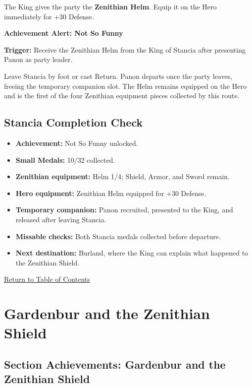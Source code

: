 \documentclass[
  american,
  10pt,
  letterpaper,
  oneside,
  open=any]{scrreprt}
\providecommand{\tightlist}{%
  \setlength{\itemsep}{0pt}\setlength{\parskip}{0pt}}
\begin{document}
The King gives the party the \textbf{Zenithian Helm}. Equip it on the
Hero immediately for +30 Defense.

\begin{achievementalert}

\textbf{Achievement Alert: Not So Funny}

\textbf{Trigger:} Receive the Zenithian Helm from the King of Stancia
after presenting Panon as party leader.

\end{achievementalert}

Leave Stancia by foot or cast Return. Panon departs once the party
leaves, freeing the temporary companion slot. The Helm remains equipped
on the Hero and is the first of the four Zenithian equipment pieces
collected by this route.

\section{Stancia Completion Check}\label{stancia-completion-check}

\begin{itemize}
\tightlist
\item
  \textbf{Achievement:} Not So Funny unlocked.
\item
  \textbf{Small Medals:} 10/32 collected.
\item
  \textbf{Zenithian equipment:} Helm 1/4; Shield, Armor, and Sword
  remain.
\item
  \textbf{Hero equipment:} Zenithian Helm equipped for +30 Defense.
\item
  \textbf{Temporary companion:} Panon recruited, presented to the King,
  and released after leaving Stancia.
\item
  \textbf{Missable checks:} Both Stancia medals collected before
  departure.
\item
  \textbf{Next destination:} Burland, where the King can explain what
  happened to the Zenithian Shield.
\end{itemize}

\hyperref[table-of-contents]{Return to Table of Contents}

\chapter{Gardenbur and the Zenithian
Shield}\label{gardenbur-and-the-zenithian-shield}

\section{Section Achievements: Gardenbur and the Zenithian
Shield}\label{section-achievements-gardenbur-and-the-zenithian-shield}
\end{document}

